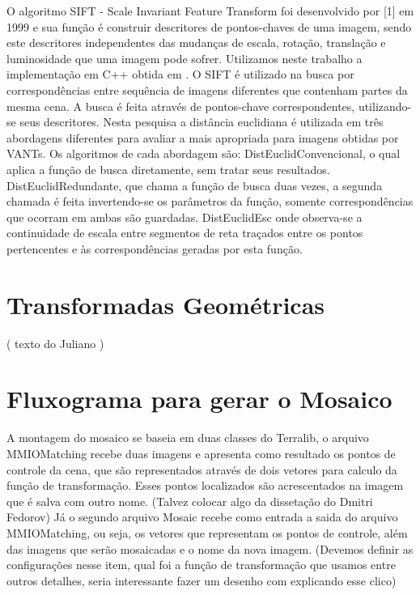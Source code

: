 \documentclass[9pt, a4paper, nofonttune, journal]{IEEEtran}
\begin{document}
O algoritmo SIFT - Scale Invariant Feature Transform foi desenvolvido por [1] em 1999 e sua função é construir descritores de pontos-chaves de uma imagem, sendo este descritores independentes das mudanças de escala, rotação, translação e luminosidade que uma imagem pode sofrer. Utilizamos neste trabalho a implementação em C++ obtida em \cite{vedaldi}.
O SIFT é utilizado na busca por correspondências entre sequência de imagens diferentes que contenham partes da mesma cena. A busca é feita através de pontos-chave correspondentes, utilizando-se seus descritores. Nesta pesquisa a distância euclidiana é utilizada em três abordagens diferentes para avaliar a mais apropriada para imagens obtidas por VANTs. Os algoritmos de cada abordagem são: DistEuclidConvencional, o qual aplica a função de busca diretamente, sem tratar seus resultados. DistEuclidRedundante, que chama a função de busca duas vezes, a segunda chamada é feita invertendo-se os parâmetros da função, somente correspondências que ocorram em ambas são guardadas. DistEuclidEsc onde observa-se a continuidade de escala entre segmentos de reta traçados entre os pontos pertencentes e às correspondências geradas por esta função.


\clearpage

\section{Transformadas Geométricas}
( texto do Juliano )

\section{ Fluxograma para gerar o Mosaico}
 A montagem do mosaico se baseia em duas classes do Terralib, o arquivo MMIOMatching recebe duas imagens e apresenta como resultado os pontos de controle da cena, que são representados através de dois vetores para calculo da função de transformação. Esses pontos localizados são acrescentados na imagem que é salva com outro nome.
(Talvez colocar algo da dissetação do Dmitri Fedorov)
 Já o segundo arquivo  Mosaic recebe como entrada  a saida do  arquivo MMIOMatching, ou seja, os vetores  que representam os pontos de controle, além das imagens que serão mosaicadas e o nome da nova imagem.
(Devemos definir as configurações nesse item, qual foi a função de transformação que usamos entre outros detalhes, seria interessante fazer um desenho com explicando esse clico)
\end{document}
